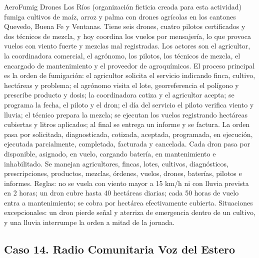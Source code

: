 \documentclass[11pt]{article}
\newcommand{\subseccion}[1]{\subsection{\textcolor{midblue}{#1}}}
\begin{document}
AeroFumig Drones Los Ríos (organización ficticia creada para esta actividad) fumiga cultivos de maíz, arroz y palma con drones agrícolas en los cantones Quevedo, Buena Fe y Ventanas. Tiene seis drones, cuatro pilotos certificados y dos técnicos de mezcla, y hoy coordina los vuelos por mensajería, lo que provoca vuelos con viento fuerte y mezclas mal registradas. Los actores son el agricultor, la coordinadora comercial, el agrónomo, los pilotos, los técnicos de mezcla, el encargado de mantenimiento y el proveedor de agroquímicos. El proceso principal es la orden de fumigación: el agricultor solicita el servicio indicando finca, cultivo, hectáreas y problema; el agrónomo visita el lote, georreferencia el polígono y prescribe producto y dosis; la coordinadora cotiza y el agricultor acepta; se programa la fecha, el piloto y el dron; el día del servicio el piloto verifica viento y lluvia; el técnico prepara la mezcla; se ejecutan los vuelos registrando hectáreas cubiertas y litros aplicados; al final se entrega un informe y se factura. La orden pasa por solicitada, diagnosticada, cotizada, aceptada, programada, en ejecución, ejecutada parcialmente, completada, facturada y cancelada. Cada dron pasa por disponible, asignado, en vuelo, cargando batería, en mantenimiento e inhabilitado. Se manejan agricultores, fincas, lotes, cultivos, diagnósticos, prescripciones, productos, mezclas, órdenes, vuelos, drones, baterías, pilotos e informes. Reglas: no se vuela con viento mayor a 15 km/h ni con lluvia prevista en 2 horas; un dron cubre hasta 40 hectáreas diarias; cada 50 horas de vuelo entra a mantenimiento; se cobra por hectárea efectivamente cubierta. Situaciones excepcionales: un dron pierde señal y aterriza de emergencia dentro de un cultivo, y una lluvia interrumpe la orden a mitad de la jornada.

\subseccion{Caso 14. Radio Comunitaria Voz del Estero}
\end{document}
